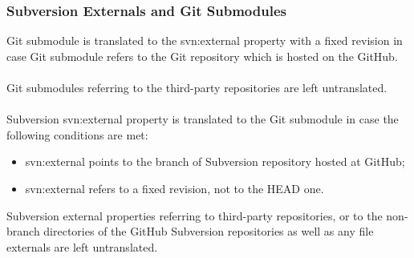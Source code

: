 \subsubsection{Subversion Externals and Git Submodules}
\label{section_externals_and_submodules}
Git submodule is translated to the svn:external property with a fixed revision in case Git submodule refers to the Git repository
which is hosted on the GitHub.
\\\\
Git submodules referring to the third-party repositories are left untranslated.
\\\\
Subversion svn:external property is translated to the Git submodule in case the following conditions are met:
\begin{itemize}
\item svn:external points to the branch of Subversion repository hosted at GitHub;
\item svn:external refers to a fixed revision, not to the HEAD one.
\end{itemize}
Subversion external properties referring to third-party repositories, or to the non-branch directories of the GitHub Subversion repositories as
well as any file externals are left untranslated.